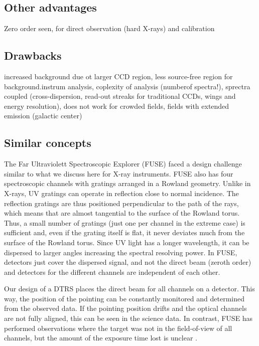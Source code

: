 \documentclass[linenumbers]{aastex631}
\begin{document}
{{\subsection{Other advantages}

Zero order seen, for direct observation (hard X-rays) and calibration

\subsection{Drawbacks}
increased background due ot larger CCD region, less source-free region for background.instrum analysis, coplexity of analysis (numberof spectra!), sprectra coupled (cross-dispersion, read-out streaks for traditional CCDs, wings and energy resolution), does not work for crowded fields, fields with extended emission (galactic center)


\subsection{Similar concepts}

The Far Ultraviolett Spectroscopic Explorer (FUSE) \cite{2000ApJ...538L...1M} faced a design challenge similar to what we discuss here for X-ray instruments. FUSE also has four spectroscopic channels with gratings arranged in a Rowland geometry. Unlike in X-rays, UV gratings can operate in reflection close to normal incidence. The reflection gratings are thus positioned perpendicular to the path of the rays, which means that are almost tangential to the surface of the Rowland torus. Thus, a small number of gratings (just one per channel in the extreme case) is sufficient and, even if the grating itself is flat, it never deviates much from the surface of the Rowland torus. Since UV light has a longer wavelength, it can be dispersed to larger angles increasing the spectral resolving power. In FUSE, detectors just cover the dispersed signal, and not the direct beam (zeroth order) and detectors for the different channels are independent of each other.

Our design of a DTRS places the direct beam for all channels on a detector. This way, the position of the pointing can be constantly monitored and determined from the observed data. If the pointing position drifts and the optical channels are not fully aligned, this can be seen in the science data. In contrast, FUSE has performed observations where the target was not in the field-of-view of all channels, but the amount of the exposure time lost is unclear \cite{2000ApJ...538L...1M}.

}}
\end{document}

